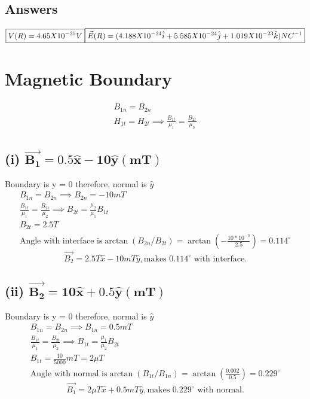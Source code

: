 \documentclass[11pt, a4paper]{article}
\begin{document}
\subsection*{Answers}
\(\boxed{V(R) =4.65 X 10^{-25} V}\\\boxed{\vec{E}(R)=  (4.188X10^{-24}\hat{i}+ 5.585X10^{-24} \hat{j}+1.019 X 10^{-23} \hat{k} )NC^{-1} }\)
\section{Magnetic Boundary}

\begin{gather}
    B_{1n} = B_{2n}\\
    H_{1t} = H_{2t}  \implies \frac{B_{1t}}{\mu_1} =  \frac{B_{2t}}{\mu_2} 
\end{gather}
\subsection*{(i) \(\mathbf{\vec{B_1} = 0.5 \hat{x} -10 \hat{y} (mT)}\) }
Boundary is y = 0 therefore, normal is \(\hat{y} \) 
\begin{gather}
    B_{1n} = B_{2n}\implies B_{2n} = -10mT \\
    \frac{B_{1t}}{\mu_1} = \frac{B_{2t}}{\mu_2} \implies  B_{2t} = \frac{\mu_2}{\mu_1}B_{1t}\\
    B_{2t} = 2.5 T\\
    \text{Angle with interface is} \arctan (B_{2n}/B_{2t} ) = \arctan (-\frac{10*10^{-3} }{2.5}) = 0.114^{\circ}
\end{gather}
\begin{equation}
    \boxed{\vec{B_2} = 2.5T\hat{x}  - 10mT \hat{y} , \text{makes } 0.114^{\circ} \text{ with interface.}}
\end{equation}
\subsection*{(ii) \(\mathbf{\vec{B_2} = 10 \hat{x} + 0.5 \hat{y} (mT)}\) }
Boundary is y = 0 therefore, normal is \(\hat{y} \) 
\begin{gather}
    B_{1n}  = B_{2n} \implies B_{1n} = 0.5 mT\\
    \frac{B_{1t}}{\mu_1} = \frac{B_{2t}}{\mu_2} \implies B_{1t} = \frac{\mu_1}{\mu_2}B_{2t}\\
    B_{1t} = \frac{10}{5000}mT = 2 \mu T\\
    \text{Angle with normal is} \arctan(B_{1t}/B_{1n}) = \arctan(\frac{0.002}{0.5}) = 0.229^{\circ}
\end{gather}
\begin{equation}
    \boxed{\vec{B_1} = 2\mu T\hat{x}  +0.5mT \hat{y} , \text{makes } 0.229^{\circ} \text{ with normal.}}
\end{equation}
\end{document}
